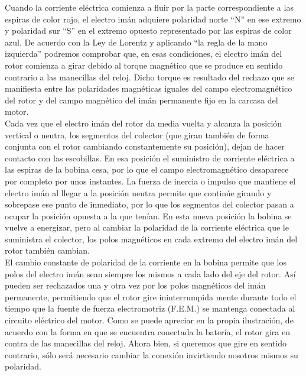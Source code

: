 \documentclass[12pt,a4paper]{article}
\begin{document}
Cuando la corriente eléctrica comienza a fluir por la parte correspondiente a las espiras de color rojo, el electro imán adquiere polaridad norte “N” en ese extremo y polaridad sur “S” en el extremo opuesto representado por las espiras de color azul. 
De acuerdo con la Ley de Lorentz y aplicando “la regla de la mano izquierda” podremos comprobar que, en esas condiciones, el electro imán del rotor comienza a girar debido al torque magnético que se produce en sentido contrario a las manecillas del reloj. Dicho torque es resultado del rechazo que se manifiesta entre las polaridades magnéticas iguales del campo electromagnético del rotor y del campo magnético del imán permanente fijo en la carcasa del motor.\\
Cada vez que el electro imán del rotor da media vuelta y alcanza la posición vertical o neutra, los segmentos del colector (que giran también de forma conjunta con el rotor cambiando constantemente su posición), dejan de hacer contacto con las escobillas. En esa posición el suministro de corriente eléctrica a las espiras de la bobina cesa, por lo que el campo electromagnético desaparece por completo por unos instantes. La fuerza de inercia o impulso que mantiene el electro imán al llegar a la posición neutra permite que continúe girando y sobrepase ese punto de inmediato, por lo que los segmentos del colector pasan a ocupar la posición opuesta a la que tenían. En esta nueva posición la bobina se vuelve a energizar, pero al cambiar la polaridad de la corriente eléctrica que le suministra el colector, los polos magnéticos en cada extremo del electro imán del rotor también cambian.\\
El cambio constante de polaridad de la corriente en la bobina permite que los polos del electro imán sean siempre los mismos a cada lado del eje del rotor. Así pueden ser rechazados una y otra vez por los polos magnéticos del imán permanente, permitiendo que el rotor gire ininterrumpida mente durante todo el tiempo que la fuente de fuerza electromotriz (F.E.M.) se mantenga conectada al circuito eléctrico del motor.
Como se puede apreciar en la propia ilustración, de acuerdo con la forma en que se encuentra conectada la batería, el rotor gira en contra de las manecillas del reloj. Ahora bien, si queremos que gire en sentido contrario, sólo será necesario cambiar la conexión invirtiendo nosotros mismos su polaridad.\\
\end{document}
